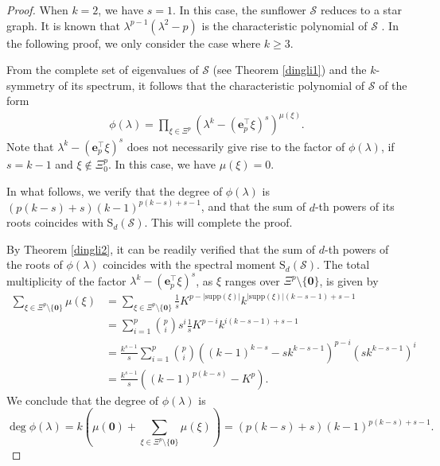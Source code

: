\documentclass{article}
\begin{document}
\begin{proof}
When $k=2$, we have $s=1$.
In this case, the sunflower $\mathcal{S}$ reduces to a star graph.
It is known that $\lambda^{p-1}(\lambda^{2}-p)$ is the characteristic polynomial of $\mathcal{S}$ \cite{cvetkovic1980spectra}.
In the following proof, we only consider the case where $k \geq 3$.

From the complete set of eigenvalues of $\mathcal{S}$ (see Theorem  \ref{dingli1}) and the $k$-symmetry of its spectrum,
it follows that the characteristic polynomial of $\mathcal{S}$ of the form
\begin{align*}
\phi(\lambda)=\prod_{\xi\in\Xi^{p}}(\lambda^{k}-(\mathbf{e}_{p}^{\top}\xi)^{s})^{\mu(\xi)}.
\end{align*}
Note that $\lambda^k-(\mathbf{e}_{p}^{\top}\xi)^{s}$ does not necessarily give rise to the factor of $\phi(\lambda)$,
if $s=k-1$ and $\xi \notin \Xi_0^p$. In this case, we have $\mu(\xi)=0$.

In what follows, we verify that the degree of $\phi(\lambda)$ is $(p(k-s)+s)(k-1)^{p(k-s)+s-1}$,
and that the sum of $d$-th powers of its roots coincides with $\mathrm{S}_{d}(\mathcal{S})$. This will complete the proof.

By Theorem \ref{dingli2}, it can be readily verified that the sum of $d$-th powers of the roots of $\phi(\lambda)$ coincides with the spectral moment $\mathrm{S}_d(\mathcal{S})$.
The total multiplicity of the factor $\lambda^{k}-(\mathbf{e}_{p}^{\top}\xi)^{s}$, as $\xi$ ranges over $\Xi^{p} \setminus \{\mathbf{0}\}$, is given by
\begin{align*}
\sum_{\xi \in \Xi^{p} \setminus \{\mathbf{0}\}}\mu(\xi)
&=\sum_{\xi \in \Xi^{p} \setminus \{\mathbf{0}\}}\frac{1}{s}K^{p-|\mathrm{supp}(\xi)|}k^{|\mathrm{supp}(\xi)|(k-s-1)+s-1} \\
&=\sum_{i=1}^{p}\binom{p}{i}s^{i}\frac{1}{s}K^{p-i}k^{i(k-s-1)+s-1}\\
&=\frac{k^{s-1}}{s}\sum_{i=1}^{p}\binom{p}{i}\left((k-1)^{k-s}-sk^{k-s-1}\right)^{p-i}(sk^{k-s-1})^{i}\\
&=\frac{k^{s-1}}{s}((k-1)^{p(k-s)}-K^{p}).
\end{align*}
We conclude that the degree of $\phi(\lambda)$ is
$$\deg\phi(\lambda)=k(\mu(\mathbf{0})+\sum_{\xi \in \Xi^{p} \setminus \{\mathbf{0}\}}\mu(\xi))=(p(k - s) + s)(k - 1)^{p(k - s) + s - 1}.$$
\end{proof}
\end{document}
